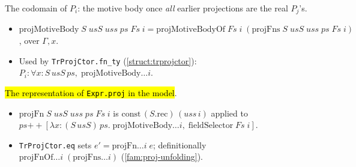 \begin{definition}
  \label{def:proj-motive-body}
  \leanok

   The codomain of $P_i$: the motive body once \emph{all} earlier projections are
  the real $P_j$'s.
  \begin{itemize}
  \item $\mathrm{projMotiveBody}\;S\;usS\;uss\;ps\;Fs\;i =
        \mathrm{projMotiveBodyOf}\;Fs\;i\;(\mathrm{projFns}\;S\;usS\;uss\;ps\;Fs\;i)$, over
        $\Gamma,x$.
  \item Used by \texttt{TrProjCtor.fn\_ty} (\ref{struct:trprojctor}): $P_i:\forall
        x{:}S\,usS\,ps,\;\mathrm{projMotiveBody}\dots i$.
  \end{itemize}
\end{definition}

\begin{definition}
  \label{def:proj-fn}
  \leanok

   \hl{The representation of \texttt{Expr.proj} in the model}.
  \begin{itemize}
  \item $\mathrm{projFn}\;S\;usS\;uss\;ps\;Fs\;i$ is $\mathrm{const}\,(S.\mathrm{rec})\,(uss\,i)$
        applied to $ps \mathbin{+\!\!+} [\lambda x{:}(S\,usS)\,ps.\;\mathrm{projMotiveBody}\dots i,\;
        \mathrm{fieldSelector}\;Fs\;i]$.
  \item \texttt{TrProjCtor.eq} sets $e'=\mathrm{projFn}\dots i\;e$; definitionally
        $\mathrm{projFnOf}\dots i\;(\mathrm{projFns}\dots i)$ (\ref{fam:proj-unfolding}).
  \end{itemize}
\end{definition}

